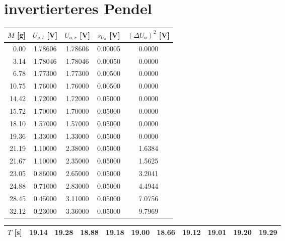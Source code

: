 

\section{invertierteres Pendel}
\begin{center}
    \begin{tabular}{|rcccc|}
        \hline
        $M$ [g] &  $U_{a,l}$ [V] &  $U_{a,r}$ [V] &  $s_{U_a}$ [V] &  $(\Delta U_a)^2$ [V] \\
        \hline
         0.00 &  1.78606 &  1.78606 &  0.00005 &   0.0000 \\
         3.14 &  1.78046 &  1.78046 &  0.00050 &   0.0000 \\
         6.78 &  1.77300 &  1.77300 &  0.00500 &   0.0000 \\
        10.75 &  1.76000 &  1.76000 &  0.00500 &   0.0000 \\
        14.42 &  1.72000 &  1.72000 &  0.05000 &   0.0000 \\
        15.72 &  1.70000 &  1.70000 &  0.05000 &   0.0000 \\
        18.10 &  1.57000 &  1.57000 &  0.05000 &   0.0000 \\
        19.36 &  1.33000 &  1.33000 &  0.05000 &   0.0000 \\
        21.19 &  1.10000 &  2.38000 &  0.05000 &   1.6384 \\
        21.67 &  1.10000 &  2.35000 &  0.05000 &   1.5625 \\
        23.05 &  0.86000 &  2.65000 &  0.05000 &   3.2041 \\
        24.88 &  0.71000 &  2.83000 &  0.05000 &   4.4944 \\
        28.45 &  0.45000 &  3.11000 &  0.05000 &   7.0756 \\
        32.12 &  0.23000 &  3.36000 &  0.05000 &   9.7969 \\
        \hline
    \end{tabular}
\end{center}
\begin{center}
    \begin{tabular}{| c | cccccccccc |}
        \hline
        $T$ [s]&19.14&19.28&18.88&19.18&19.00&18.66&19.12&19.01&19.20&19.29\\
        \hline
    \end{tabular}
\end{center}
